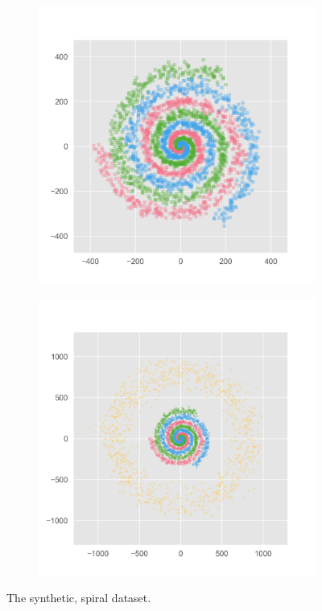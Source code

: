 \begin{figure}
    \centering
    \begin{subfigure}{0.4\textwidth}
      \centering
      \includegraphics[trim=0 0 0 0, clip, width=\linewidth]{plots/2a.png}
      \label{fig:2a}
    \end{subfigure}
    \begin{subfigure}{0.4\textwidth}
      \centering
      \includegraphics[trim=0 0 0 0, clip, width=\linewidth]{plots/2b.png}
      \label{fig:2b}
    \end{subfigure}
    \caption{The synthetic, spiral dataset. }
    \label{fig:2}
\end{figure}

